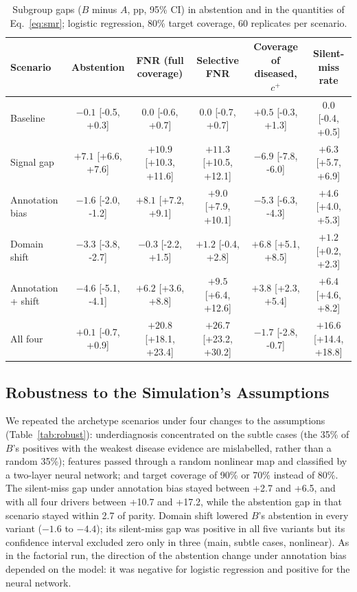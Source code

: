\begin{table}[t]
\centering
\caption{Subgroup gaps ($B$ minus $A$, pp, 95\% CI) in abstention and in the quantities of Eq.~\eqref{eq:smr}; logistic regression, 80\% target coverage, 60 replicates per scenario.}
\label{tab:decomp}
\footnotesize
\begin{tabular}{@{}lccccc@{}}
\toprule
Scenario & Abstention & FNR (full coverage) & Selective FNR & Coverage of diseased, $c^{+}$ & Silent-miss rate \\
\midrule
Baseline & $-0.1$ {\scriptsize[-0.5, +0.3]} & $0.0$ {\scriptsize[-0.6, +0.7]} & $0.0$ {\scriptsize[-0.7, +0.7]} & $+0.5$ {\scriptsize[-0.3, +1.3]} & $0.0$ {\scriptsize[-0.4, +0.5]} \\
Signal gap & $+7.1$ {\scriptsize[+6.6, +7.6]} & $+10.9$ {\scriptsize[+10.3, +11.6]} & $+11.3$ {\scriptsize[+10.5, +12.1]} & $-6.9$ {\scriptsize[-7.8, -6.0]} & $+6.3$ {\scriptsize[+5.7, +6.9]} \\
Annotation bias & $-1.6$ {\scriptsize[-2.0, -1.2]} & $+8.1$ {\scriptsize[+7.2, +9.1]} & $+9.0$ {\scriptsize[+7.9, +10.1]} & $-5.3$ {\scriptsize[-6.3, -4.3]} & $+4.6$ {\scriptsize[+4.0, +5.3]} \\
Domain shift & $-3.3$ {\scriptsize[-3.8, -2.7]} & $-0.3$ {\scriptsize[-2.2, +1.5]} & $+1.2$ {\scriptsize[-0.4, +2.8]} & $+6.8$ {\scriptsize[+5.1, +8.5]} & $+1.2$ {\scriptsize[+0.2, +2.3]} \\
Annotation + shift & $-4.6$ {\scriptsize[-5.1, -4.1]} & $+6.2$ {\scriptsize[+3.6, +8.8]} & $+9.5$ {\scriptsize[+6.4, +12.6]} & $+3.8$ {\scriptsize[+2.3, +5.4]} & $+6.4$ {\scriptsize[+4.6, +8.2]} \\
All four & $+0.1$ {\scriptsize[-0.7, +0.9]} & $+20.8$ {\scriptsize[+18.1, +23.4]} & $+26.7$ {\scriptsize[+23.2, +30.2]} & $-1.7$ {\scriptsize[-2.8, -0.7]} & $+16.6$ {\scriptsize[+14.4, +18.8]} \\
\bottomrule
\end{tabular}
\end{table}

\subsection{Robustness to the Simulation's Assumptions}
We repeated the archetype scenarios under four changes to the assumptions (Table~\ref{tab:robust}): underdiagnosis concentrated on the subtle cases (the 35\% of $B$'s positives with the weakest disease evidence are mislabelled, rather than a random 35\%); features passed through a random nonlinear map and classified by a two-layer neural network; and target coverage of 90\% or 70\% instead of 80\%. The silent-miss gap under annotation bias stayed between +2.7 and +6.5\pp, and with all four drivers between +10.7 and +17.2\pp, while the abstention gap in that scenario stayed within 2.7\pp{} of parity. Domain shift lowered $B$'s abstention in every variant ($-1.6$ to $-4.4$\pp); its silent-miss gap was positive in all five variants but its confidence interval excluded zero only in three (main, subtle cases, nonlinear). As in the factorial run, the direction of the abstention change under annotation bias depended on the model: it was negative for logistic regression and positive for the neural network.

